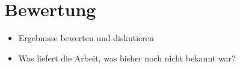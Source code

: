 \chapter{Bewertung}

\begin{itemize}
	\item Ergebnisse bewerten und diskutieren
	\item Was liefert die Arbeit, was bisher noch nicht bekannt war?
\end{itemize}

